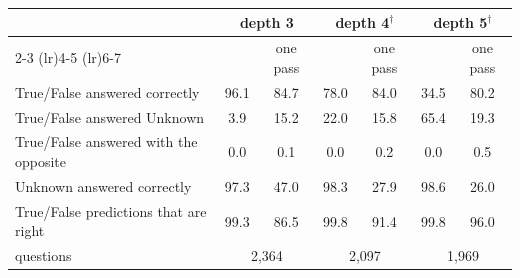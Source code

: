 \begin{tabular}{lcccccc}
\toprule
 & \multicolumn{2}{c}{depth 3} & \multicolumn{2}{c}{depth 4$^\dagger$} & \multicolumn{2}{c}{depth 5$^\dagger$} \\
\cmidrule(lr){2-3} \cmidrule(lr){4-5} \cmidrule(lr){6-7}
 & \zr{} & one pass & \zr{} & one pass & \zr{} & one pass \\
\midrule
True/False answered correctly & 96.1 & 84.7 & 78.0 & 84.0 & 34.5 & 80.2 \\
True/False answered Unknown & 3.9 & 15.2 & 22.0 & 15.8 & 65.4 & 19.3 \\
True/False answered with the opposite & 0.0 & 0.1 & 0.0 & 0.2 & 0.0 & 0.5 \\
Unknown answered correctly & 97.3 & 47.0 & 98.3 & 27.9 & 98.6 & 26.0 \\
True/False predictions that are right & 99.3 & 86.5 & 99.8 & 91.4 & 99.8 & 96.0 \\
\midrule
questions & \multicolumn{2}{c}{2,364} & \multicolumn{2}{c}{2,097} & \multicolumn{2}{c}{1,969} \\
\bottomrule
\end{tabular}
